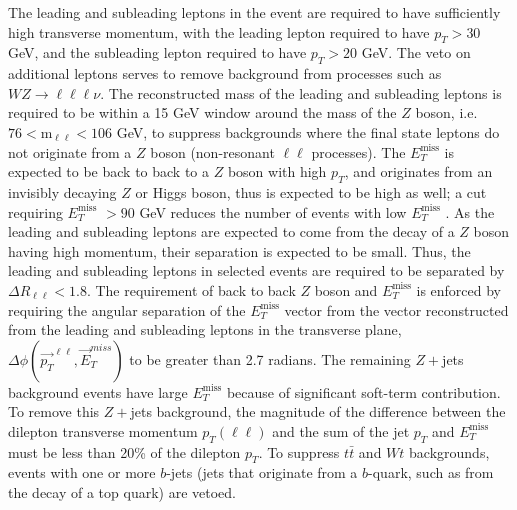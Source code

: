\documentclass[11pt,a4paper,openright,twoside]{report}
\newcommand{\met}{$E_T^{\mathrm{miss}}$ }
\begin{document}
The leading and subleading leptons in the event are required to have sufficiently high transverse momentum, with the leading lepton required to have $p_T>30$ GeV, and the subleading lepton required to have $p_T>20$ GeV. The veto on additional leptons serves to remove background from processes such as $WZ\to \ell\ell\ell\nu$. The reconstructed mass of the leading and subleading leptons is required to be within a 15 GeV window around the mass of the $Z$ boson, i.e. $76<\mathrm{m_{\ell\ell}<106}$ GeV, to suppress backgrounds where the final state leptons do not originate from a $Z$ boson (non-resonant $\ell\ell$ processes). The \met is expected to be back to back to a $Z$ boson with high $p_T$, and originates from an invisibly decaying $Z$ or Higgs boson, thus is expected to be high as well; a cut requiring \met$>90$ GeV reduces the number of events with low \met. As the leading and subleading leptons are expected to come from the decay of a $Z$ boson having high momentum, their separation is expected to be small. Thus, the leading and subleading leptons in selected events are required to be separated by $\Delta R_{\ell\ell}<1.8$. The requirement of back to back $Z$ boson and \met is enforced by requiring the angular separation of the \met vector from the vector reconstructed from the leading and subleading leptons in the transverse plane, $\Delta\phi(\vec{p_T}^{\ell\ell},\vec{E}_T^{miss})$ to be greater than 2.7 radians. The remaining $Z+$jets background events have large \met because of significant soft-term contribution. To remove this $Z+$jets background, the magnitude of the difference between the dilepton transverse momentum $p_T(\ell\ell)$ and the sum of the jet $p_T$ and \met must be less than 20\% of the dilepton $p_T$. To suppress $t\bar{t}$ and $Wt$ backgrounds, events with one or more $b$-jets (jets that originate from a $b$-quark, such as from the decay of a top quark) are vetoed.
\end{document}
